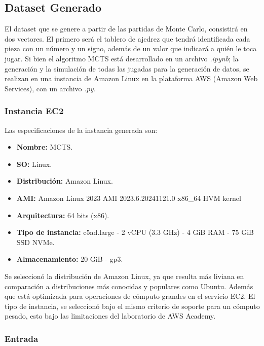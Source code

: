 \subsection{Dataset Generado}

El dataset que se genere a partir de las partidas de Monte Carlo, consistirá en dos vectores. El primero será el tablero de ajedrez que tendrá identificada cada pieza con un número y un signo, además de un valor que indicará a quién le toca jugar.\newline
Si bien el algoritmo MCTS está desarrollado en un archivo \textit{.ipynb}; la generación y la simulación de todas las jugadas para la generación de datos, se realizan en una instancia de Amazon Linux en la plataforma AWS (Amazon Web Services), con un archivo \textit{.py.}

\subsubsection{Instancia EC2}

Las especificaciones de la instancia generada son:
\begin{itemize}
    \item \textbf{Nombre:} MCTS.
    \item \textbf{SO:} Linux.
    \item \textbf{Distribución:} Amazon Linux.
    \item \textbf{AMI:} Amazon Linux 2023 AMI 2023.6.20241121.0 x86\_64 HVM kernel
    \item \textbf{Arquitectura:} 64 bits (x86).
    \item \textbf{Tipo de instancia:} c5ad.large - 2 vCPU (3.3 GHz) - 4 GiB RAM - 75 GiB SSD NVMe.
    \item \textbf{Almacenamiento:} 20 GiB - gp3.
\end{itemize}

Se seleccionó la distribución de Amazon Linux, ya que resulta más liviana en comparación a distribuciones más conocidas y populares como Ubuntu. Además que está optimizada para operaciones de cómputo grandes en el servicio EC2.\newline
El tipo de instancia, se seleccionó bajo el mismo criterio de soporte para un cómputo pesado, esto bajo las limitaciones del laboratorio de AWS Academy.

\subsubsection{Entrada}

